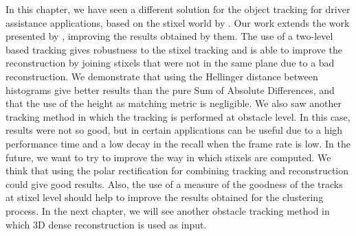 In this chapter, we have seen a different solution for the object tracking for driver assistance applications, based on the stixel world by \cite{badino2009stixel}. Our work extends the work presented by \cite{gunyel2012stixels}, improving the results obtained by them. The use of a two-level based tracking gives robustness to the stixel tracking and is able to improve the reconstruction by joining stixels that were not in the same plane due to a bad reconstruction. We demonstrate that using the Hellinger distance between histograms give better results than the pure Sum of Absolute Differences, and that the use of the height as matching metric is negligible.
We also saw another tracking method in which the tracking is performed at obstacle level. In this case, results were not so good, but in certain applications can be useful due to a high performance time and a low decay in the recall when the frame rate is low.
In the future, we want to try to improve the way in which stixels are computed. We think that using the polar rectification for combining tracking and reconstruction could give good results. Also, the use of a measure of the goodness of the tracks at stixel level should help to improve the results obtained for the clustering process.
In the next chapter, we will see another obstacle tracking method in which 3D dense reconstruction is used as input.

